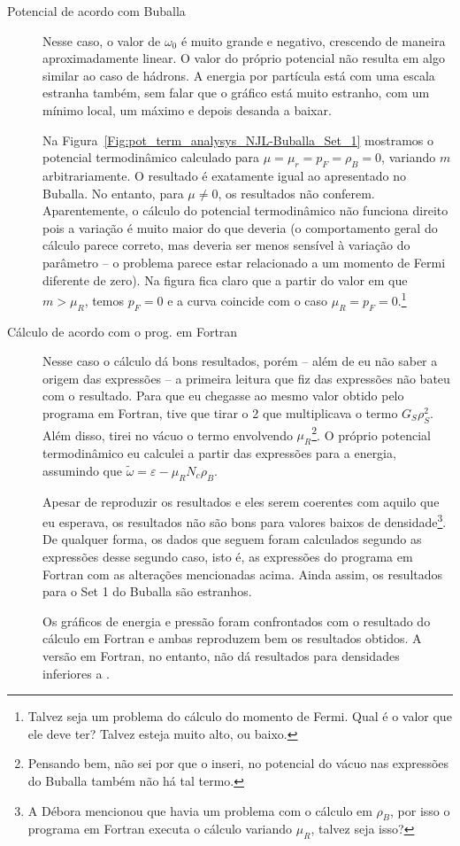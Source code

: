 \begin{description}
	\item[Potencial de acordo com Buballa] Nesse caso, o valor de $\omega_0$ é muito grande e negativo, crescendo de maneira aproximadamente linear. O valor do próprio potencial não resulta em algo similar ao caso de hádrons. A energia por partícula está com uma escala estranha também, sem falar que o gráfico está muito estranho, com um mínimo local, um máximo e depois desanda a baixar.

Na Figura~\ref{Fig:pot_term_analysys_NJL-Buballa_Set_1} mostramos o potencial termodinâmico calculado para $\mu = \mu_r = p_F = \rho_B = 0$, variando $m$ arbitrariamente. O resultado é exatamente igual ao apresentado no Buballa. No entanto, para $\mu \neq 0$, os resultados não conferem. Aparentemente, o cálculo do potencial termodinâmico não funciona direito pois a variação é muito maior do que deveria (o comportamento geral do cálculo parece correto, mas deveria ser menos sensível à variação do parâmetro -- o problema parece estar relacionado a um momento de Fermi diferente de zero). Na figura fica claro que a partir do valor em que $m > \mu_R$, temos $p_F = 0$ e a curva coincide com o caso $\mu_R = p_F = 0$.\footnote{Talvez seja um problema do cálculo do momento de Fermi. Qual é o valor que ele deve ter? Talvez esteja muito alto, ou baixo.}

	\item[Cálculo de acordo com o prog. em Fortran] Nesse caso o cálculo dá bons resultados, porém -- além de eu não saber a origem das expressões -- a primeira leitura que fiz das expressões não bateu com o resultado. Para que eu chegasse ao mesmo valor obtido pelo programa em Fortran, tive que tirar o 2 que multiplicava o termo $G_S \rho_S^2$. Além disso, tirei no vácuo o termo envolvendo $\mu_R$\footnote{Pensando bem, não sei por que o inseri, no potencial do vácuo nas expressões do Buballa também não há tal termo.}. O próprio potencial termodinâmico eu calculei a partir das expressões para a energia, assumindo que $\tilde{\omega} = \varepsilon - \mu_R N_c \rho_B$.
	
	Apesar de reproduzir os resultados e eles serem coerentes com aquilo que eu esperava, os resultados não são bons para valores baixos de densidade\footnote{A Débora mencionou que havia um problema com o cálculo em $\rho_B$, por isso o programa em Fortran executa o cálculo variando $\mu_R$, talvez seja isso?}. De qualquer forma, os dados que seguem foram calculados segundo as expressões desse segundo caso, isto é, as expressões do programa em Fortran com as alterações mencionadas acima. Ainda assim, os resultados para o Set 1 do Buballa são estranhos.
	
	Os gráficos de energia e pressão foram confrontados com o resultado do cálculo em Fortran e ambas reproduzem bem os resultados obtidos. A versão em Fortran, no entanto, não dá resultados para densidades inferiores a .
\end{description}   

